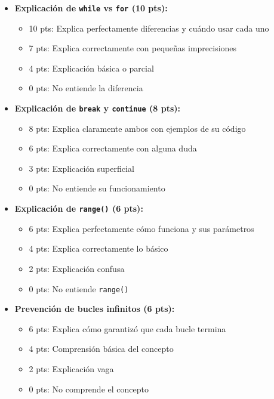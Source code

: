 \documentclass[12pt,a4paper]{article}
\begin{document}
\begin{itemize}[leftmargin=*]
    \item \textbf{Explicación de \texttt{while} vs \texttt{for} (10 pts):}
    \begin{itemize}
        \item 10 pts: Explica perfectamente diferencias y cuándo usar cada uno
        \item 7 pts: Explica correctamente con pequeñas imprecisiones
        \item 4 pts: Explicación básica o parcial
        \item 0 pts: No entiende la diferencia
    \end{itemize}
    
    \item \textbf{Explicación de \texttt{break} y \texttt{continue} (8 pts):}
    \begin{itemize}
        \item 8 pts: Explica claramente ambos con ejemplos de su código
        \item 6 pts: Explica correctamente con alguna duda
        \item 3 pts: Explicación superficial
        \item 0 pts: No entiende su funcionamiento
    \end{itemize}
    
    \item \textbf{Explicación de \texttt{range()} (6 pts):}
    \begin{itemize}
        \item 6 pts: Explica perfectamente cómo funciona y sus parámetros
        \item 4 pts: Explica correctamente lo básico
        \item 2 pts: Explicación confusa
        \item 0 pts: No entiende \texttt{range()}
    \end{itemize}
    
    \item \textbf{Prevención de bucles infinitos (6 pts):}
    \begin{itemize}
        \item 6 pts: Explica cómo garantizó que cada bucle termina
        \item 4 pts: Comprensión básica del concepto
        \item 2 pts: Explicación vaga
        \item 0 pts: No comprende el concepto
    \end{itemize}
\end{itemize}
\end{document}

